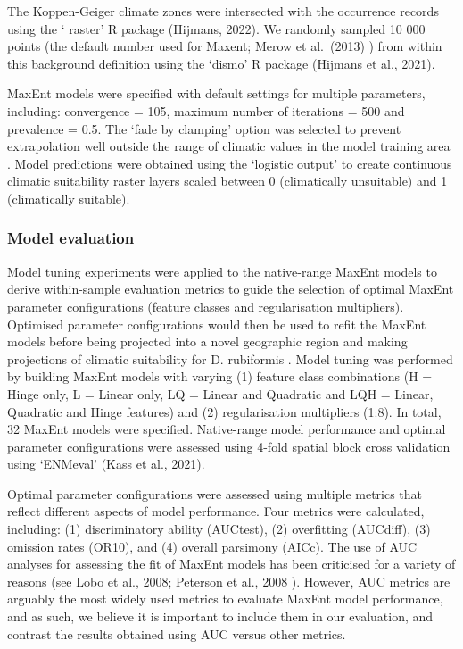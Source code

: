 \documentclass[
  authoryear,
  preprint,
  3p,
  onecolumn]{elsarticle}
\begin{document}
The Koppen-Geiger climate zones were intersected with the occurrence
records using the ` raster' R package (Hijmans, 2022). We randomly
sampled 10 000 points (the default number used for Maxent; Merow et
al.~(2013) ) from within this background definition using the `dismo' R
package (Hijmans et al., 2021).

MaxEnt models were specified with default settings for multiple
parameters, including: convergence = 105, maximum number of iterations =
500 and prevalence = 0.5. The `fade by clamping' option was selected to
prevent extrapolation well outside the range of climatic values in the
model training area \citep{Phillips2017}. Model predictions were
obtained using the `logistic output' to create continuous climatic
suitability raster layers scaled between 0 (climatically unsuitable) and
1 (climatically suitable).

\hypertarget{model-evaluation}{%
\subsubsection{Model evaluation}\label{model-evaluation}}

Model tuning experiments were applied to the native-range MaxEnt models
to derive within-sample evaluation metrics to guide the selection of
optimal MaxEnt parameter configurations (feature classes and
regularisation multipliers). Optimised parameter configurations would
then be used to refit the MaxEnt models before being projected into a
novel geographic region and making projections of climatic suitability
for D. rubiformis . Model tuning was performed by building MaxEnt models
with varying (1) feature class combinations (H = Hinge only, L = Linear
only, LQ = Linear and Quadratic and LQH = Linear, Quadratic and Hinge
features) and (2) regularisation multipliers (1:8). In total, 32 MaxEnt
models were specified. Native-range model performance and optimal
parameter configurations were assessed using 4-fold spatial block cross
validation using `ENMeval' (Kass et al., 2021).

Optimal parameter configurations were assessed using multiple metrics
that reflect different aspects of model performance. Four metrics were
calculated, including: (1) discriminatory ability (AUCtest), (2)
overfitting (AUCdiff), (3) omission rates (OR10), and (4) overall
parsimony (AICc). The use of AUC analyses for assessing the fit of
MaxEnt models has been criticised for a variety of reasons (see Lobo et
al., 2008; Peterson et al., 2008 ). However, AUC metrics are arguably
the most widely used metrics to evaluate MaxEnt model performance, and
as such, we believe it is important to include them in our evaluation,
and contrast the results obtained using AUC versus other metrics.
\end{document}

